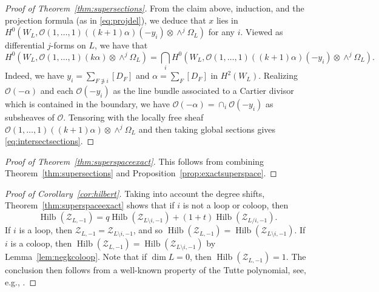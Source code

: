 \documentclass{amsart}
\theoremstyle{definition}
\begin{document}
\begin{proof}[Proof of Theorem~\ref{thm:supersections}]
From the claim above, induction, and the projection formula (as in \eqref{eq:projdel}), we deduce that $x$ lies in $H^0(W_L, \mathcal{O}(1, \dotsc, 1)((k+1)\alpha)(-y_i) \otimes \wedge^{j} \Omega_L)$ for any $i$. Viewed as differential $j$-forms on $L$, we have that
\begin{equation}\label{eq:intersectsections}
H^0(W_L, \mathcal{O}(1, \dotsc, 1)(k\alpha) \otimes \wedge^{j} \Omega_L) = \bigcap_{i} H^0(W_L, \mathcal{O}(1, \dotsc, 1)((k+1)\alpha)(-y_i) \otimes \wedge^{j} \Omega_L).
\end{equation}
Indeed, we have $y_i = \sum_{F \not \ni i} [D_F]$ and $\alpha = \sum_F [D_F]$ in $H^2(W_L)$. Realizing $\mathcal{O}(-\alpha)$ and each $\mathcal{O}(-y_i)$ as the line bundle associated to a Cartier divisor which is contained in the boundary, we have $\mathcal{O}(-\alpha) = \cap_i \mathcal{O}(-y_i)$ as subsheaves of $\mathcal{O}$. Tensoring with the locally free sheaf $\mathcal{O}(1, \dotsc, 1)((k+1)\alpha) \otimes \wedge^{j} \Omega_L$ and then taking global sections gives \eqref{eq:intersectsections}. 
\end{proof}

\begin{proof}[Proof of Theorem~\ref{thm:superspaceexact}]
This follows from combining Theorem~\ref{thm:supersections} and Proposition~\ref{prop:exactsuperspace}. 
\end{proof}

\begin{proof}[Proof of Corollary~\ref{cor:hilbert}]
Taking into account the degree shifts, Theorem~\ref{thm:superspaceexact} shows that if $i$ is  not a loop or coloop, then
$$\operatorname{Hilb}(\mathcal{Z}_{L, -1}) = q \operatorname{Hilb}(\mathcal{Z}_{L \setminus i, -1}) + (1 + t) \operatorname{Hilb}(\mathcal{Z}_{L/i, -1}).$$
If $i$ is a loop, then $\mathcal{Z}_{L, -1} = \mathcal{Z}_{L \setminus i, -1}$, and so $\operatorname{Hilb}(\mathcal{Z}_{L, -1}) = \operatorname{Hilb}(\mathcal{Z}_{L \setminus i, -1})$. If $i$ is a coloop, then $\operatorname{Hilb}(\mathcal{Z}_{L, -1}) = \operatorname{Hilb}(\mathcal{Z}_{L \setminus i, -1})$ by Lemma~\ref{lem:negkcoloop}. 
Note that if $\dim L = 0$, then $\operatorname{Hilb}(\mathcal{Z}_{L, -1}) = 1$. The conclusion then follows from a well-known property of the Tutte polynomial, see, e.g., \cite[(2.5)]{MR1716762}. 
\end{proof}
\end{document}
